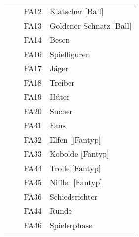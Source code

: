\begin{tabular}{| l l l l |}
	& & FA12 & Klatscher [Ball]\\
	& & FA13 & Goldener Schnatz [Ball]\\
	& & FA14 & Besen\\
	& & FA16 & Spielfiguren\\
	& & FA17 & Jäger\\
	& & FA18 & Treiber\\
	& & FA19 & Hüter\\
	& & FA20 & Sucher\\
	& & FA31 & Fans\\
	& & FA32 & Elfen []Fantyp]\\
	& & FA33 & Kobolde [Fantyp]\\
	& & FA34 & Trolle [Fantyp]\\
	& & FA35 & Niffler [Fantyp]\\
	& & FA36 & Schiedsrichter\\
	& & FA44 & Runde\\
	& & FA46 & Spielerphase\\\hline
	
\end{tabular}